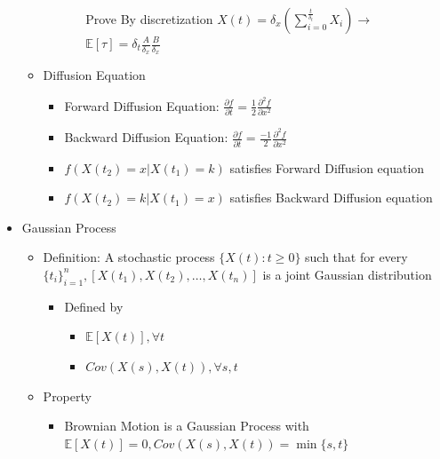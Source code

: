 \documentclass[a4paper]{article}
\begin{document}
\begin{itemize}
\begin{itemize}
\begin{itemize}
\begin{itemize}
                                Prove By discretization $X(t) = \delta_x (\sum_{i=0}^{\frac{t}{\delta_t}} X_i) \rightarrow$
                                $\mathbb{E}[\tau] = \delta_t \frac{A}{\delta_x} \frac{B}{\delta_x}$
                        \end{itemize}
                \end{itemize}
            \item Diffusion Equation
                \begin{itemize}
                    \item Forward Diffusion Equation: $\frac{\partial f}{\partial t} = \frac{1}{2} \frac{\partial^2 f}{\partial x^2}$
                    \item Backward Diffusion Equation: $\frac{\partial f}{\partial t} = \frac{-1}{2} \frac{\partial^2 f}{\partial x^2}$
                    \item $f(X(t_2) = x| X(t_1) = k)$ satisfies Forward Diffusion equation
                    \item $f(X(t_2) = k| X(t_1) = x)$ satisfies Backward Diffusion equation
                \end{itemize}
        \end{itemize}
    \item Gaussian Process
        \begin{itemize}
            \item Definition: A stochastic process $\{X(t): t \geq 0\}$ such that for every $\{t_i\}_{i=1}^n, [X(t_1), X(t_2), \dots, X(t_n)]$ is a joint Gaussian distribution
                \begin{itemize}
                    \item Defined by
                        \begin{itemize}
                            \item $\mathbb{E}[X(t)], \forall t$
                            \item $\mathit{Cov}(X(s), X(t)), \forall s, t$
                        \end{itemize}
                \end{itemize}
            \item Property
                \begin{itemize}
                    \item Brownian Motion is a Gaussian Process with $\mathbb{E}[X(t)] = 0, \mathit{Cov}(X(s), X(t)) = \min\{s, t\}$
                        \begin{itemize}

\end{itemize}
\end{itemize}
\end{itemize}
\end{itemize}
\end{document}
